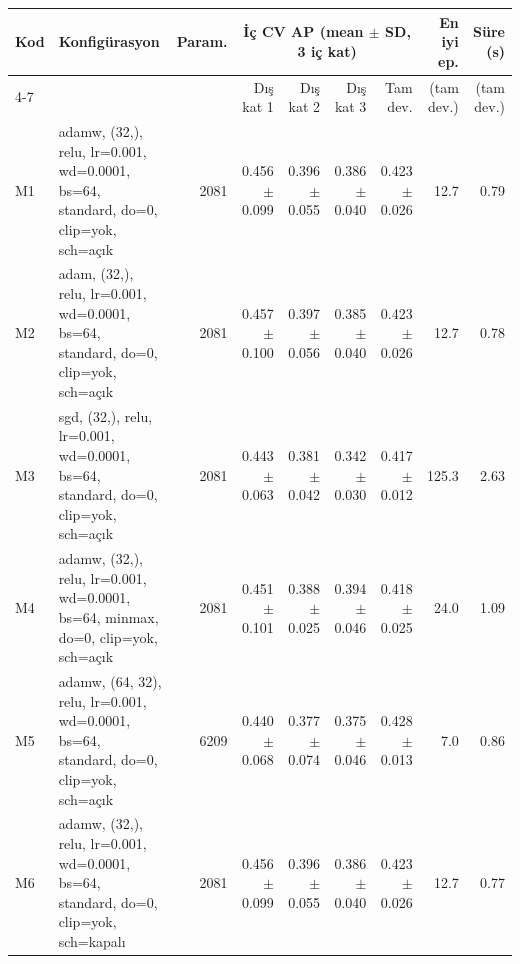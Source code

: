 \begin{tabular}{l l r r r r r r r}\toprule
Kod & Konfigürasyon & Param. & \multicolumn{4}{c}{İç CV AP (mean $\pm$ SD, 3 iç kat)} & En iyi ep. & Süre (s) \\
\cmidrule(lr){4-7} & & & Dış kat 1 & Dış kat 2 & Dış kat 3 & Tam dev. & (tam dev.) & (tam dev.) \\\midrule
M1 & {\scriptsize adamw, (32,), relu, lr=0.001, wd=0.0001, bs=64, standard, do=0, clip=yok, sch=açık} & 2081 & 0.456 $\pm$ 0.099 & 0.396 $\pm$ 0.055 & 0.386 $\pm$ 0.040 & 0.423 $\pm$ 0.026 & 12.7 & 0.79 \\
M2 & {\scriptsize adam, (32,), relu, lr=0.001, wd=0.0001, bs=64, standard, do=0, clip=yok, sch=açık} & 2081 & 0.457 $\pm$ 0.100 & 0.397 $\pm$ 0.056 & 0.385 $\pm$ 0.040 & 0.423 $\pm$ 0.026 & 12.7 & 0.78 \\
M3 & {\scriptsize sgd, (32,), relu, lr=0.001, wd=0.0001, bs=64, standard, do=0, clip=yok, sch=açık} & 2081 & 0.443 $\pm$ 0.063 & 0.381 $\pm$ 0.042 & 0.342 $\pm$ 0.030 & 0.417 $\pm$ 0.012 & 125.3 & 2.63 \\
M4 & {\scriptsize adamw, (32,), relu, lr=0.001, wd=0.0001, bs=64, minmax, do=0, clip=yok, sch=açık} & 2081 & 0.451 $\pm$ 0.101 & 0.388 $\pm$ 0.025 & 0.394 $\pm$ 0.046 & 0.418 $\pm$ 0.025 & 24.0 & 1.09 \\
M5 & {\scriptsize adamw, (64, 32), relu, lr=0.001, wd=0.0001, bs=64, standard, do=0, clip=yok, sch=açık} & 6209 & 0.440 $\pm$ 0.068 & 0.377 $\pm$ 0.074 & 0.375 $\pm$ 0.046 & 0.428 $\pm$ 0.013 & 7.0 & 0.86 \\
M6 & {\scriptsize adamw, (32,), relu, lr=0.001, wd=0.0001, bs=64, standard, do=0, clip=yok, sch=kapalı} & 2081 & 0.456 $\pm$ 0.099 & 0.396 $\pm$ 0.055 & 0.386 $\pm$ 0.040 & 0.423 $\pm$ 0.026 & 12.7 & 0.77 \\
\bottomrule\end{tabular}